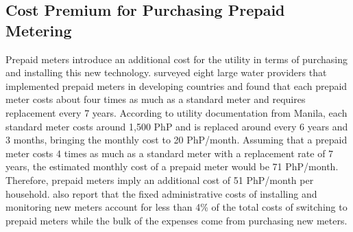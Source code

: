 \documentclass[12pt,table]{article}
\begin{document}
\subsection{Cost Premium for Purchasing Prepaid Metering}\label{appendix:prepaidcosts}

Prepaid meters introduce an additional cost for the utility in terms of purchasing and installing this new technology.  \cite{heymans2014limits} surveyed eight large water providers that implemented prepaid meters in developing countries and found that each prepaid meter costs about four times as much as a standard meter and requires replacement every 7 years.  According to utility documentation from Manila, each standard meter costs around 1,500 PhP and is replaced around every 6 years and 3 months, bringing the monthly cost to 20 PhP/month.  Assuming that a prepaid meter costs 4 times as much as a standard meter with a replacement rate of 7 years, the estimated monthly cost of a prepaid meter would be 71 PhP/month.  Therefore, prepaid meters imply an additional cost of 51 PhP/month per household.  \cite{heymans2014limits} also report that the fixed administrative costs of installing and monitoring new meters account for less than 4\% of the total costs of switching to prepaid meters while the bulk of the expenses come from purchasing new meters.  
\end{document}
